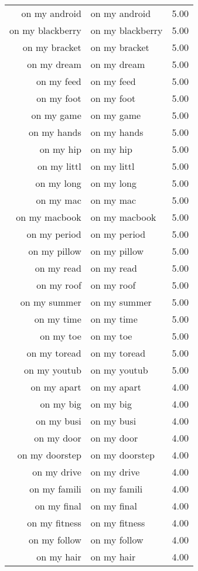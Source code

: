 \begin{table}[ht]
\begin{tabular}{rlr}
  on my android & on my android & 5.00 \\ 
  on my blackberry & on my blackberry & 5.00 \\ 
  on my bracket & on my bracket & 5.00 \\ 
  on my dream & on my dream & 5.00 \\ 
  on my feed & on my feed & 5.00 \\ 
  on my foot & on my foot & 5.00 \\ 
  on my game & on my game & 5.00 \\ 
  on my hands & on my hands & 5.00 \\ 
  on my hip & on my hip & 5.00 \\ 
  on my littl & on my littl & 5.00 \\ 
  on my long & on my long & 5.00 \\ 
  on my mac & on my mac & 5.00 \\ 
  on my macbook & on my macbook & 5.00 \\ 
  on my period & on my period & 5.00 \\ 
  on my pillow & on my pillow & 5.00 \\ 
  on my read & on my read & 5.00 \\ 
  on my roof & on my roof & 5.00 \\ 
  on my summer & on my summer & 5.00 \\ 
  on my time & on my time & 5.00 \\ 
  on my toe & on my toe & 5.00 \\ 
  on my toread & on my toread & 5.00 \\ 
  on my youtub & on my youtub & 5.00 \\ 
  on my apart & on my apart & 4.00 \\ 
  on my big & on my big & 4.00 \\ 
  on my busi & on my busi & 4.00 \\ 
  on my door & on my door & 4.00 \\ 
  on my doorstep & on my doorstep & 4.00 \\ 
  on my drive & on my drive & 4.00 \\ 
  on my famili & on my famili & 4.00 \\ 
  on my final & on my final & 4.00 \\ 
  on my fitness & on my fitness & 4.00 \\ 
  on my follow & on my follow & 4.00 \\ 
  on my hair & on my hair & 4.00 \\ 

\end{tabular}
\end{table}
